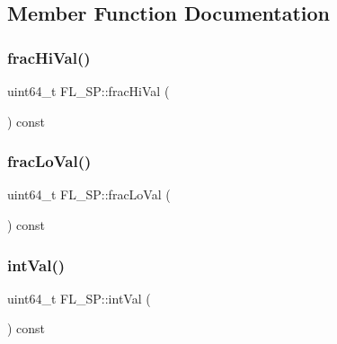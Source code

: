 \subsection{Member Function Documentation}
\mbox{\label{struct_f_l___s_p_a8717bf668103c1de5dfa31cdfabe1b8f}} 
\subsubsection{\texorpdfstring{frac\+Hi\+Val()}{fracHiVal()}}
{\footnotesize\ttfamily uint64\+\_\+t F\+L\+\_\+\+S\+P\+::frac\+Hi\+Val (\begin{DoxyParamCaption}{ }\end{DoxyParamCaption}) const\hspace{0.3cm}{\ttfamily [inline]}}

\mbox{\label{struct_f_l___s_p_a4121e057fe776544e13014bc15aaceea}} 
\subsubsection{\texorpdfstring{frac\+Lo\+Val()}{fracLoVal()}}
{\footnotesize\ttfamily uint64\+\_\+t F\+L\+\_\+\+S\+P\+::frac\+Lo\+Val (\begin{DoxyParamCaption}{ }\end{DoxyParamCaption}) const\hspace{0.3cm}{\ttfamily [inline]}}

\mbox{\label{struct_f_l___s_p_ac515b72596b07a75ab80173537e0358a}} 
\subsubsection{\texorpdfstring{int\+Val()}{intVal()}}
{\footnotesize\ttfamily uint64\+\_\+t F\+L\+\_\+\+S\+P\+::int\+Val (\begin{DoxyParamCaption}{ }\end{DoxyParamCaption}) const\hspace{0.3cm}{\ttfamily [inline]}}




